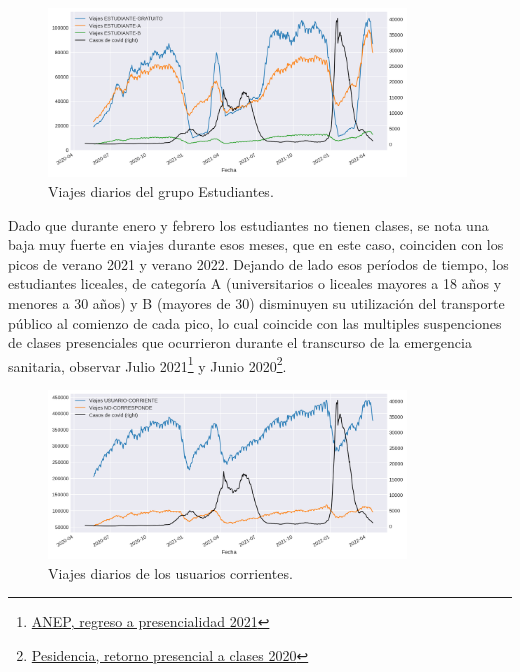 \documentclass[conference]{IEEEtran}
\begin{document}
\begin{figure}[htbp]
\centerline{\includegraphics[width=95mm]{Pictures/estudiantes.png}}
\caption{Viajes diarios del grupo Estudiantes.}
\label{estudiantes}
\end{figure}

Dado que durante enero y febrero los estudiantes no tienen clases, se nota una baja muy fuerte en viajes durante esos meses, que en este caso, coinciden con los picos de verano 2021 y verano 2022. Dejando de lado esos períodos de tiempo, los estudiantes liceales, de categoría A (universitarios o liceales mayores a 18 años y menores a 30 años) y B (mayores de 30) disminuyen su utilización del transporte público al comienzo de cada pico, lo cual coincide con las multiples suspenciones de clases presenciales que ocurrieron durante el transcurso de la emergencia sanitaria, observar Julio 2021\footnote{\href{https://www.anep.edu.uy/15-d/el-lunes-19-anep-completar-el-regreso-presencialidad-con-educaci-n-media#:~:text=El\%20pr\%C3\%B3ximo\%20lunes\%2019\%20de,de\%20Secundaria\%20y\%20T\%C3\%A9cnico\%20Profesional}{ANEP, regreso a presencialidad 2021}} y Junio 2020\footnote{\href{https://www.gub.uy/presidencia/comunicacion/noticias/gobierno-anuncio-retorno-presencial-voluntario-clases-partir-junio}{Pesidencia, retorno presencial a clases 2020}}.

\begin{figure}[htbp]
\centerline{\includegraphics[width=95mm]{Pictures/corriente.png}}
\caption{Viajes diarios de los usuarios corrientes.}
\label{corriente}
\end{figure}
\end{document}

